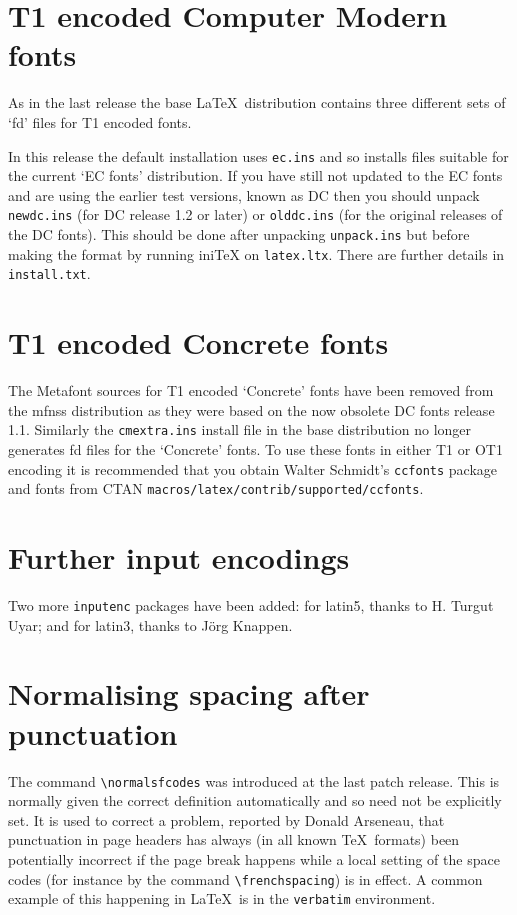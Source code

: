\documentclass{ltnews}
\providecommand\pkg[1]{\texttt{#1}}
\providecommand\env[1]{\texttt{#1}}
\providecommand\file[1]{\texttt{#1}}
\begin{document}
\maketitle

\section{T1 encoded Computer Modern fonts}
As in the last release the base \LaTeX\ distribution contains
three different sets of `fd' files for T1 encoded fonts.

In this release the default installation uses \file{ec.ins}
and so installs files suitable for the current `EC fonts'
distribution. If you have still not updated to the EC fonts and
are using the earlier test versions, known as DC then you should
unpack \file{newdc.ins} (for DC release 1.2 or later) or
\file{olddc.ins} (for the original releases of the DC fonts).
This should be done after unpacking \file{unpack.ins} but
before making the format by running ini\TeX{} on \file{latex.ltx}.
There are further details in \file{install.txt}.


\section{T1 encoded Concrete fonts}
The Metafont sources for T1 encoded `Concrete' fonts have been
removed from the \textsf{mfnss} distribution as they were based
on the now obsolete DC fonts release 1.1. Similarly the
\file{cmextra.ins} install file in the \textsf{base} distribution no
longer generates fd files for the `Concrete' fonts.
To use these fonts in either T1 or OT1 encoding it is
recommended that you obtain Walter Schmidt's \pkg{ccfonts} package
and fonts from CTAN \file{macros/latex/contrib/supported/ccfonts}.


\section{Further input encodings}
Two more \pkg{inputenc} packages have been added: for latin5,
thanks to H. Turgut Uyar; and for latin3, thanks to J\"org Knappen.


\section{Normalising spacing after punctuation}
The command \verb|\normalsfcodes| was introduced at the last patch
release. This is normally given the correct definition automatically
and so need not be explicitly set. It is used to correct a problem,
reported by Donald Arseneau, that punctuation in page headers has
always (in all known \TeX\ formats) been potentially incorrect if the
page break happens while a local setting of the space codes (for
instance by the command \verb|\frenchspacing|) is in effect. A common
example of this happening in \LaTeX\ is in the \env{verbatim}
environment.
\end{document}
